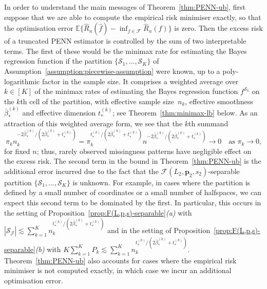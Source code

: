 \documentclass[12pt]{article}
\newcommand{\orange}[1]{\textcolor{orange}{#1}}
\def\hat{\widehat}
\begin{document}
In order to understand the main messages of Theorem~\ref{thm:PENN-ub}, first suppose that we are able to compute the empirical risk minimiser exactly, so that the optimisation error $\mathbb{E}\bigl\{\hat{R}_n(\hat{f}) - \inf_{f\in\mathcal{F}} \hat{R}_n(f) \bigr\}$ is zero.  Then the excess risk of a truncated PENN estimator is controlled by the sum of two interpretable terms.  The first of these would be the minimax rate for estimating the Bayes regression function if the partition $\{\mathcal{S}_1,\ldots,\mathcal{S}_K\}$ of Assumption~\ref{assumption:piecewise-assumption} were known, up to a poly-logarithmic factor in the sample size.  It comprises a weighted average over $k \in [K]$ of the minimax rates of estimating the Bayes regression function $f^{\mathcal{S}_k}$ on the $k$th cell of the partition, with effective sample size~$n_k$, effective smoothness~$\bar{\beta}_*^{(k)}$ and effective dimension $t_*^{(k)}$; see Theorem~\ref{thm:minimax-lb} below.  %
As an attraction of this weighted average form, we see that the $k$th summand
\[
\pi_k n_k^{-2\bar{\beta}_*^{(k)} / (2\bar{\beta}_*^{(k)} + t_*^{(k)})} = \pi_k^{t_*^{(k)} / (2\bar{\beta}_*^{(k)} + t_*^{(k)})} n^{-2\bar{\beta}_*^{(k)} / (2\bar{\beta}_*^{(k)} + t_*^{(k)})} \to 0 \quad\text{as $\pi_k \rightarrow 0$,}
\]
for fixed $n$; thus, rarely observed missingness patterns have negligible effect on the excess risk.  The second term in the bound in Theorem~\ref{thm:PENN-ub} is the additional error incurred due to the fact that the $\mathcal{F}(L_2,\bm p_2,s_2)$-separable partition $\{\mathcal{S}_1,\ldots,\mathcal{S}_K\}$ is unknown.  For example, in cases where the partition is defined by a small number of coordinates or a small number of halfspaces, we can expect this second term to be dominated by the first.  In particular, this occurs in the setting of Proposition~\ref{prop:F(L,p,s)-separable}\emph{(a)} with $|\mathcal{S}_{\mathcal{J}}| \lesssim \sum_{k=1}^K n_k^{t^{(k)}_*/(2\bar\beta^{(k)}_* + t^{(k)}_*)}$ and in the setting of Proposition~\ref{prop:F(L,p,s)-separable}\emph{(b)} with $K\sum_{k=1}^K P_k \lesssim \sum_{k=1}^K n_k^{t^{(k)}_*/(2\bar\beta^{(k)}_* + t^{(k)}_*)}$.   Theorem~\ref{thm:PENN-ub} also accounts for cases where the empirical risk minimiser is not computed exactly, in which case we incur an additional optimisation error.  
\end{document}
